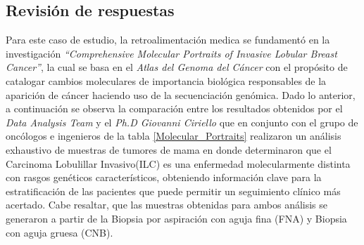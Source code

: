\subsection{Revisión de respuestas}
Para este caso de estudio, la retroalimentación medica se fundamentó en la investigación \textit{“Comprehensive Molecular Portraits of Invasive Lobular Breast Cancer”}\cite{Ciriello2015}, la cual se basa en el \textit {Atlas del Genoma del Cáncer} con el propósito de catalogar cambios moleculares de importancia biológica responsables de la aparición de cáncer haciendo uso de la secuenciación genómica. Dado lo anterior, a continuación se observa la comparación entre los resultados obtenidos por el \textit{Data Analysis Team} y el \textit{Ph.D Giovanni Ciriello} que en conjunto con el grupo de oncólogos e ingenieros de la tabla \ref{Molecular_Portraits} realizaron un análisis exhaustivo de muestras de tumores de mama en donde determinaron que el Carcinoma Lobulillar Invasivo(ILC) es una enfermedad molecularmente distinta con rasgos genéticos característicos, obteniendo información clave para la estratificación de las pacientes que puede permitir un seguimiento clínico más acertado. Cabe resaltar, que las muestras obtenidas para ambos análisis se generaron a partir de la Biopsia por aspiración con aguja fina (FNA) y Biopsia con aguja gruesa (CNB).
